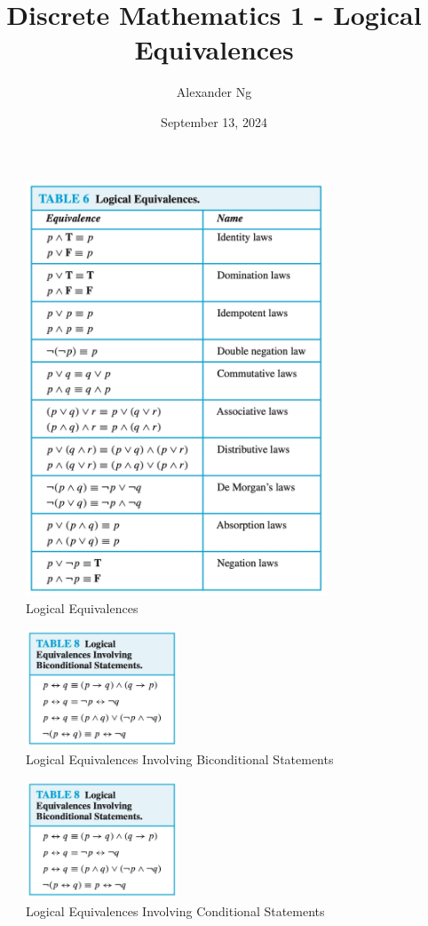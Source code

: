 \documentclass[12pt]{article}
\begin{document}
\title{Discrete Mathematics 1 - Logical Equivalences}
\author{Alexander Ng}
\date{September 13, 2024}

\maketitle

\begin{figure}[H]
    \centering
    \includegraphics[width=0.8\textwidth]{"./Logical Equivalences.jpg"}
    \caption{Logical Equivalences}
\end{figure}

\begin{figure}[H]
    \centering
    \includegraphics[width=0.4\textwidth]{"./Logical Equivalences Involving Biconditional Statements.jpg"}
    \caption{Logical Equivalences Involving Biconditional Statements}
\end{figure}

\begin{figure}[H]
    \centering
    \includegraphics[width=0.4\textwidth]{"./Logical Equivalences Involving Biconditional Statements.jpg"}
    \caption{Logical Equivalences Involving Conditional Statements}
\end{figure}
\end{document}
